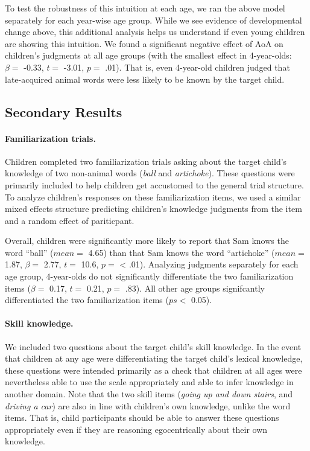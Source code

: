 \documentclass[10pt, letterpaper]{article}
\begin{document}
To test the robustness of this intuition at each age, we ran the above
model separately for each year-wise age group. While we see evidence of
developmental change above, this additional analysis helps us understand
if even young children are showing this intuition. We found a
significant negative effect of AoA on children's judgments at all age
groups (with the smallest effect in 4-year-olds: \(\beta =\) -0.33,
\(t =\) -3.01, \(p =\) .01). That is, even 4-year-old children judged
that late-acquired animal words were less likely to be known by the
target child.

\hypertarget{secondary-results}{%
\subsection{Secondary Results}\label{secondary-results}}

\hypertarget{familiarization-trials.}{%
\paragraph{Familiarization trials.}\label{familiarization-trials.}}

Children completed two familiarization trials asking about the target
child's knowledge of two non-animal words (\emph{ball} and
\emph{artichoke}). These questions were primarily included to help
children get accustomed to the general trial structure. To analyze
children's responses on these familiarization items, we used a similar
mixed effects structure predicting children's knowledge judgments from
the item and a random effect of pariticpant.

Overall, children were significantly more likely to report that Sam
knows the word ``ball'' (\(mean =\) 4.65) than that Sam knows the word
``artichoke'' (\(mean =\) 1.87, \(\beta =\) 2.77, \(t =\) 10.6, \(p =\)
\textless{} .01). Analyzing judgments separately for each age group,
4-year-olds do not significantly differentiate the two familiarization
items (\(\beta =\) 0.17, \(t =\) 0.21, \(p =\) .83). All other age
groups signifcantly differentiated the two familiarization items
(\(ps <\) 0.05).

\hypertarget{skill-knowledge.}{%
\paragraph{Skill knowledge.}\label{skill-knowledge.}}

We included two questions about the target child's skill knowledge. In
the event that children at any age were differentiating the target
child's lexical knowledge, these questions were intended primarily as a
check that children at all ages were nevertheless able to use the scale
appropriately and able to infer knowledge in another domain. Note that
the two skill items (\emph{going up and down stairs}, and \emph{driving
a car}) are also in line with children's own knowledge, unlike the word
items. That is, child participants should be able to answer these
questions appropriately even if they are reasoning egocentrically about
their own knowledge.
\end{document}
